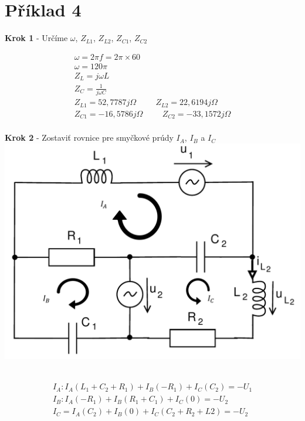 \section{Příklad 4}

\begin{center}
    \textbf{Krok 1} - Určíme $\omega$, $Z_{L1}$, $Z_{L2}$, $Z_{C1}$, $Z_{C2}$
\end{center}

\begin{gather*}
\omega = 2 \pi f = 2 \pi \times 60 \\
\omega = 120 \pi \\
Z_L = j \omega L \\
Z_C = \frac {1} {j \omega C} \\
Z_{L1} = 52,7787j \Omega \hspace{1cm}
Z_{L2} = 22,6194j \Omega \\
 	Z_{C1} = -16,5786j \Omega \hspace{1cm}
Z_{C2} = -33,1572j \Omega \\
\end{gather*}

\begin{center}
    	\textbf{Krok 2} - Zostaviť rovnice pre smyčkové prúdy $I_A$, $I_B$ a $I_C$
	\includegraphics[scale=0.4,keepaspectratio]{fig/pr_4_1.png} \
\end{center}

\begin{gather*}
I_A: I_A(L_1+C_2+R_1) + I_B(-R_1)+I_C(C_2) = -U_1 \\
I_B: I_A(-R_1) + I_B(R_1+C_1) + I_C(0) = -U_2 \\
I_C = I_A(C_2) + I_B(0) + I_C(C_2 + R_2 + L2) = -U_2 \\
\end{gather*}

